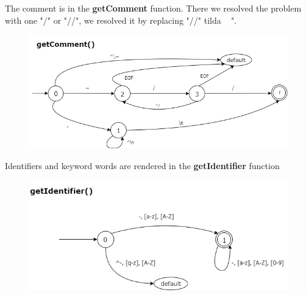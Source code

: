 \documentclass[12pt,a4paper,titlepage]{report}
\begin{document}

\begin{justify}
The comment is in the \textbf{getComment} function.
There we resolved the problem with one "/" or "//", we resolved it by replacing "//" tilda ~ ".
\end{justify}

\vspace{0.3cm}

\begin{figure}
  \begin{center}
    \includegraphics[width=1.0\textwidth]{img/getComment.png}
  \end{center}
\end{figure}

\vspace{0.4cm}

\begin{justify}
Identifiers and keyword words are rendered in the \textbf{getIdentifier} function
\end{justify}

\vspace{0.3cm}

\begin{figure}
  \begin{center}
    \includegraphics[width=1.0\textwidth]{img/getIdentifier.png}
  \end{center}
\end{figure}
\end{document}
